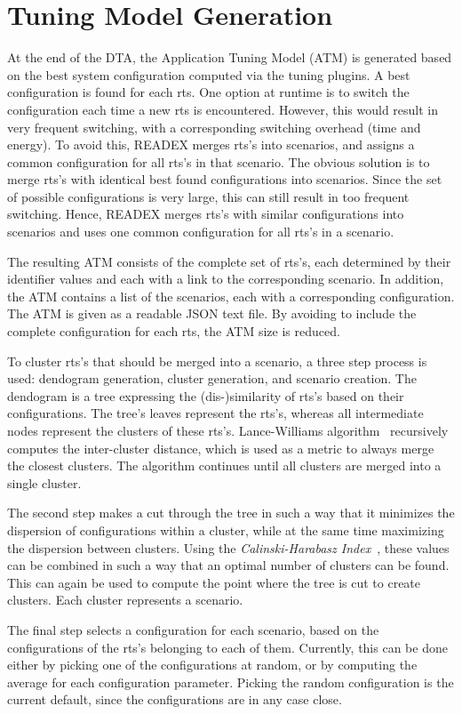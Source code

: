 \section{Tuning Model Generation} \label{tm-generation}

At the end of the DTA, the Application Tuning Model (ATM) is generated based on the best system configuration computed via the tuning plugins. A best configuration is found for each rts. One option at runtime is to switch the configuration each time a new rts is encountered. However, this would result in very frequent switching, with a 
corresponding switching overhead (time and energy). To avoid this, READEX merges rts's into scenarios, and assigns a common configuration for all rts's in that scenario. The obvious solution is to merge rts's with identical best found configurations into scenarios. Since the set of possible configurations is very large, this can still result in too frequent switching. Hence, READEX merges rts's with similar configurations into scenarios and uses one common configuration for all rts's in a scenario.

The resulting ATM consists of the complete set of rts's, each determined by their 
identifier values and each with a link to the corresponding scenario. In 
addition, the ATM contains a list of the scenarios, each with a corresponding 
configuration. The ATM is given as a readable JSON text file. By avoiding to 
include the complete configuration for each rts, the ATM size is reduced. 

To cluster rts's that should be merged into a scenario, a three step process is 
used: dendogram generation, cluster generation, and scenario creation. The 
dendogram is a tree expressing the (dis-)similarity of rts's based on their 
configurations. The tree's leaves represent the rts's, whereas all intermediate 
nodes represent the clusters of these rts's. Lance-Williams algorithm~
\cite{Lance1967} recursively computes the inter-cluster distance, which is used 
as a metric to always merge the closest clusters. The algorithm continues until 
all clusters are merged into a single cluster. 

The second step makes a cut through the tree in such a way that it minimizes the dispersion of configurations within a cluster, while at the same time maximizing the dispersion between clusters. Using the \emph{Calinski-Harabasz Index}~\cite{Calinski1974}, these values can be combined in such a way that an optimal number of clusters can be found. This can again be used to compute the point where the tree is cut to create clusters. Each cluster represents a scenario.

The final step selects a configuration for each scenario, based on the 
configurations of the rts's belonging to each of them. Currently, this can be 
done either by picking one of the configurations at random, or by computing the 
average for each configuration parameter. Picking the random configuration is 
the current default, since the configurations are in any case close.